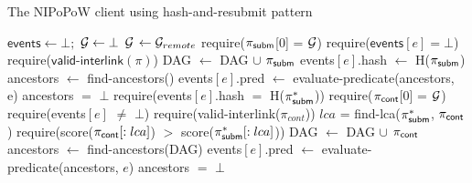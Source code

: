 \begin{algorithm}

    \caption{\label{alg:har-nipopow}The \textsf{NIPoPoW} client using hash-and-resubmit pattern}
    \begin{algorithmic}[1]

    \State $\textsf{events} \gets \bot;$ $\mathcal{G} \gets \bot$
        \State $\mathcal{G}$ $\gets \mathcal{G}_{remote}$
    \EndFunction
        \State \textsf{require}($\mathsf{\pi_{subm}}$[0] = $\mathcal{G}$)
        \State \textsf{require}($\textsf{events$[e]$} = \bot$)
        \State \textsf{require}($\textsf{valid-interlink}(\pi)$)
        \State \textsf{DAG} $\gets$ \textsf{DAG} $\cup$ $\mathsf{\pi_{subm}}$
        \State \textsf{events$[e]$.hash} $\gets$ \textsf{H}($\mathsf{\pi_{subm}}$)
        \State \textsf{ancestors} $\gets$ \textsf{find-ancestors()}
        \State \textsf{events$[e]$.pred} $\gets$
            \textsf{evaluate-predicate}(\textsf{ancestors}, e)
        \State \textsf{ancestors} $=$ $\bot$
    \EndFunction
        \State \textsf{require}(\textsf{events$[e]$.hash} $=$ \textsf{H}($\mathsf{\pi_{subm}^*}$))
        \State \textsf{require}($\mathsf{\pi_{cont}}$[0] = $\mathcal{G}$)
        \State \textsf{require}(\textsf{events}$[e]$ $\ne$ $\bot$)
        \State \textsf{require}(\textsf{valid-interlink}($\pi_{cont}$))
        \State $lca$ = \textsf{find-lca}($\mathsf{\pi_{subm}^*}$, $\mathsf{\pi_{cont}}$)
        \State \textsf{require}(\textsf{score}($\mathsf{\pi_{cont}}[:lca]$)
            $>$ \textsf{score}($\mathsf{\pi_{subm}^*}[:lca]$))
        \State \textsf{DAG} $\gets$ \textsf{DAG} $\cup$ $\mathsf{\pi_{cont}}$
        \State \textsf{ancestors} $\gets$ \textsf{find-ancestors}(\textsf{DAG})
        \State \textsf{events$[e]$.pred} $\gets$
            \textsf{evaluate-predicate}(\textsf{ancestors}, $e$)
        \State \textsf{ancestors} $=$ $\bot$
    \EndFunction
    \EndContract
    \vskip8pt
    \end{algorithmic}
\end{algorithm}

